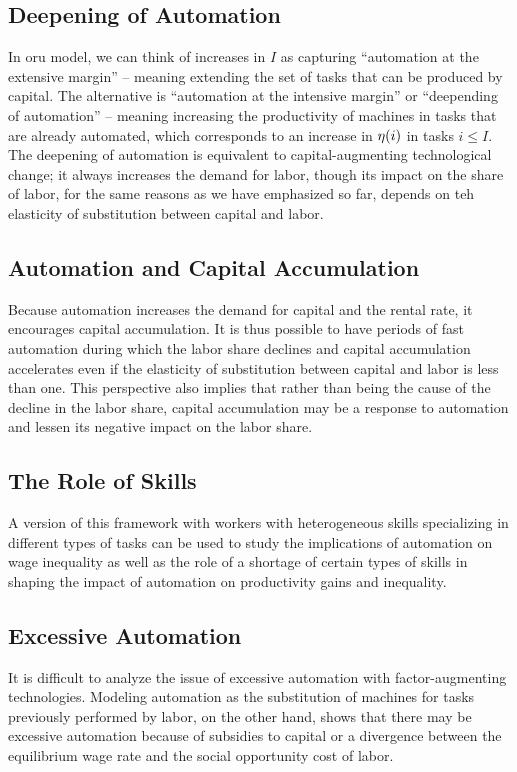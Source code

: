 \documentclass[12pt]{article}
\theoremstyle{definition}
\begin{document}
\subsection{Deepening of Automation}

In oru model, we can think of increases in $I$ as capturing ``automation at the extensive margin'' -- meaning extending the set of tasks that can be produced by capital. The alternative is ``automation at the intensive margin'' or  ``deepending of automation'' -- meaning increasing the productivity of machines in tasks that are already automated, which corresponds to an increase in $\eta{\left( i \right)}$ in tasks $i \leq I$. The deepening of automation is equivalent to capital-augmenting technological change; it always increases the demand for labor, though its impact on the share of labor, for the same reasons as we have emphasized so far, depends on teh elasticity of substitution between capital and labor. 

\subsection{Automation and Capital Accumulation}

Because automation increases the demand for capital and the rental rate, it encourages capital accumulation. It is thus possible to have periods of fast automation during which the labor share declines and capital accumulation accelerates even if the elasticity of substitution between capital and labor is less than one. This perspective also implies that rather than being the cause of the decline in the labor share, capital accumulation may be a response to automation and lessen its negative impact on the labor share.

\subsection{The Role of Skills}

A version of this framework with workers with heterogeneous skills specializing in different types of tasks can be used to study the implications of automation on wage inequality as well as the role of a shortage of certain types of skills in shaping the impact of automation on productivity gains and inequality.

\subsection{Excessive Automation}

It is difficult to analyze the issue of excessive automation with factor-augmenting technologies. Modeling automation as the substitution of machines for tasks previously performed by labor, on the other hand, shows that there may be excessive automation because of subsidies to capital or a divergence between the equilibrium wage rate and the social opportunity cost of labor.



\end{document}
